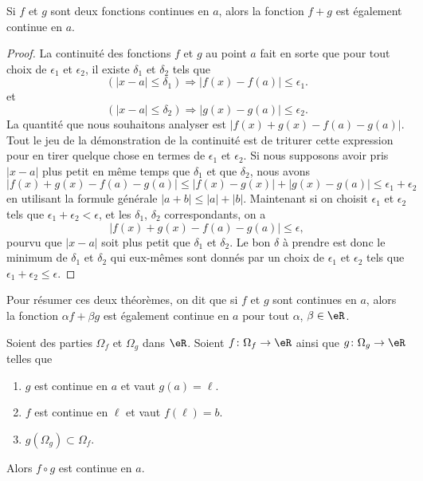 \begin{theorem}
Si $f$ et $g$ sont deux fonctions continues en $a$, alors la fonction $f+g$ est également continue en $a$.
\end{theorem}

\begin{proof}
La continuité des fonctions $f$ et $g$ au point $a$ fait en sorte que pour tout choix de $\epsilon_1$ et $\epsilon_2$, il existe $\delta_1$ et $\delta_2$ tels que
\[
  (| x-a |\leq \delta_1)\Rightarrow | f(x)-f(a) |\leq \epsilon_1.
\]
et
\[
  (| x-a |\leq \delta_2)\Rightarrow | g(x)-g(a) |\leq \epsilon_2.
\]
La quantité que nous souhaitons analyser est $| f(x)+g(x)-f(a)-g(a) |$. Tout le jeu de la démonstration de la continuité est de triturer cette expression pour en tirer quelque chose en termes de $\epsilon_1$ et $\epsilon_2$. Si nous supposons avoir pris $| x-a |$ plus petit en même temps que $\delta_1$ et que $\delta_2$, nous avons
\[
| f(x)+g(x)-f(a)-g(a) |\leq| f(x)-g(x) |+| g(x)-g(a) |\leq\epsilon_1+\epsilon_2
\]
en utilisant la formule générale $| a+b |\leq | a |+| b |$. Maintenant si on choisit $\epsilon_1$ et $\epsilon_2$ tels que $\epsilon_1+\epsilon_2<\epsilon$, et les $\delta_1$, $\delta_2$ correspondants, on a
\[
| f(x)+g(x)-f(a)-g(a) |\leq\epsilon,
\]
pourvu que $| x-a |$ soit plus petit que $\delta_1$ et $\delta_2$. Le bon $\delta$ à prendre est donc le minimum de $\delta_1$ et $\delta_2$ qui eux-mêmes sont donnés par un choix de $\epsilon_1$ et $\epsilon_2$ tels que $\epsilon_1+\epsilon_2\leq\epsilon$.
\end{proof}

Pour résumer ces deux théorèmes, on dit que si $f$ et $g$ sont continues en $a$, alors la fonction $\alpha f+\beta g$ est également continue en $a$ pour tout $\alpha$, $\beta\in\eR$.

\begin{proposition}     \label{PROPooVNKVooJvxarf}
    Soient des parties \( \Omega_f\) et \( \Omega_g\) dans \( \eR\). Soient \( f\colon \Omega_f\to \eR\) ainsi que \( g\colon \Omega_g\to \eR\) telles que
    \begin{enumerate}
        \item
            \( g\) est continue en \( a\) et vaut \( g(a)=\ell\).
        \item
            \( f\) est continue en \( \ell\) et vaut \( f(\ell)=b\).
        \item
            \( g(\Omega_g)\subset \Omega_f\).
    \end{enumerate}
    Alors \( f\circ g\) est continue en \( a\).
\end{proposition}

